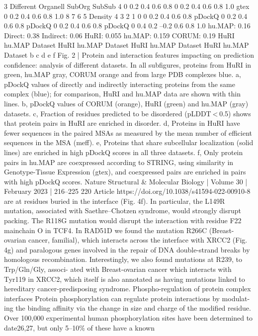3
Diﬀerent
Organell
SubOrg
SubSub
4
0
0.2
0.4
0.6
0.8
0
0.2
0.4
0.6
0.8
1.0
gtex
0
0.2
0.4
0.6
0.8
1.0
8
7
6
5
Density
4
3
2
1
0
0
0.2
0.4
0.6
0.8
pDockQ
0
0.2
0.4
0.6
0.8
pDockQ
0
0.2
0.4
0.6
0.8
pDockQ
0
0.4
0.2
–0.2
0.6
0.8
1.0
hu.MAP: 0.16
Direct: 0.38
Indirect: 0.06
HuRI: 0.055
hu.MAP: 0.159
CORUM: 0.19
HuRI
hu.MAP
Dataset
HuRI
hu.MAP
Dataset
HuRI
hu.MAP
Dataset
HuRI
hu.MAP
Dataset
b
c
d
e
f
Fig. 2 | Protein and interaction features impacting on prediction confidence:
analysis of different datasets. In all subfigures, proteins from HuRI in green,
hu.MAP gray, CORUM orange and from large PDB complexes blue. a, pDockQ
values of directly and indirectly interacting proteins from the same complex
(blue); for comparison, HuRI and hu.MAP data are shown with thin lines.
b, pDockQ values of CORUM (orange), HuRI (green) and hu.MAP (gray) datasets.
c, Fraction of residues predicted to be disordered (pLDDT < 0.5) shows that
protein pairs in HuRI are enriched in disorder. d, Proteins in HuRI have fewer
sequences in the paired MSAs as measured by the mean number of efficient
sequences in the MSA (meff). e, Proteins that share subcellular localization
(solid lines) are enriched in high pDockQ scores in all three datasets. f, Only
protein pairs in hu.MAP are coexpressed according to STRING, using similarity in
Genotype-Tissue Expression (gtex), and coexpressed pairs are enriched in pairs
with high pDockQ scores.
Nature Structural \& Molecular Biology | Volume 30 | February 2023 | 216–225
220
Article
https://doi.org/10.1038/s41594-022-00910-8
are at residues buried in the interface (Fig. 4f). In particular, the L149R
mutation, associated with Saethre–Chotzen syndrome, would strongly
disrupt packing. The R118G mutation would disrupt the interaction with
residue F22 mainchain O in TCF4. In RAD51D we found the mutation
R266C (Breast-ovarian cancer, familial), which interacts across the
interface with XRCC2 (Fig. 4g) and paralogous genes involved in the
repair of DNA double-strand breaks by homologous recombination.
Interestingly, we also found mutations at R239, to Trp/Gln/Gly, associ-
ated with Breast-ovarian cancer which interacts with Tyr119 in XRCC2,
which itself is also annotated as having mutations linked to hereditary
cancer-predisposing syndrome.
Phospho-regulation of protein complex
interfaces
Protein phosphorylation can regulate protein interactions by modulat-
ing the binding affinity via the change in size and charge of the modified
residue. Over 100,000 experimental human phosphorylation sites
have been determined to date26,27, but only 5–10\% of these have a known
